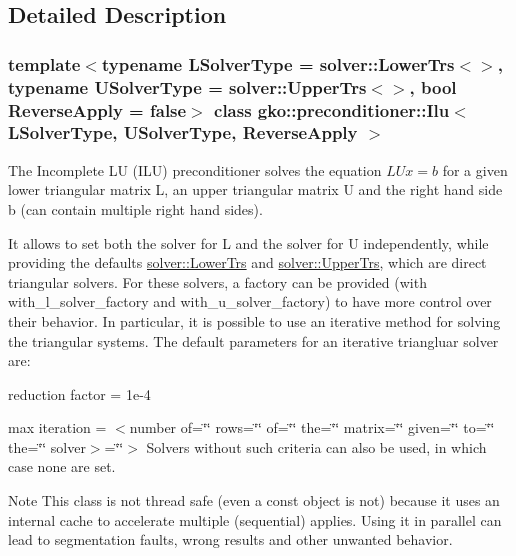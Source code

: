 \subsection{Detailed Description}
\subsubsection*{template$<$typename L\+Solver\+Type = solver\+::\+Lower\+Trs$<$$>$, typename U\+Solver\+Type = solver\+::\+Upper\+Trs$<$$>$, bool Reverse\+Apply = false$>$\newline
class gko\+::preconditioner\+::\+Ilu$<$ L\+Solver\+Type, U\+Solver\+Type, Reverse\+Apply $>$}

The Incomplete LU (I\+LU) preconditioner solves the equation $LUx = b$ for a given lower triangular matrix L, an upper triangular matrix U and the right hand side b (can contain multiple right hand sides). 

It allows to set both the solver for L and the solver for U independently, while providing the defaults \hyperlink{classgko_1_1solver_1_1LowerTrs}{solver\+::\+Lower\+Trs} and \hyperlink{classgko_1_1solver_1_1UpperTrs}{solver\+::\+Upper\+Trs}, which are direct triangular solvers. For these solvers, a factory can be provided (with {\ttfamily with\+\_\+l\+\_\+solver\+\_\+factory} and {\ttfamily with\+\_\+u\+\_\+solver\+\_\+factory}) to have more control over their behavior. In particular, it is possible to use an iterative method for solving the triangular systems. The default parameters for an iterative triangluar solver are\+:
\begin{DoxyItemize}
\item reduction factor = 1e-\/4
\item max iteration = $<$number of=\char`\"{}\char`\"{} rows=\char`\"{}\char`\"{} of=\char`\"{}\char`\"{} the=\char`\"{}\char`\"{} matrix=\char`\"{}\char`\"{} given=\char`\"{}\char`\"{} to=\char`\"{}\char`\"{} the=\char`\"{}\char`\"{} solver$>$=\char`\"{}\char`\"{}$>$ Solvers without such criteria can also be used, in which case none are set.
\end{DoxyItemize}

\begin{DoxyNote}{Note}
This class is not thread safe (even a const object is not) because it uses an internal cache to accelerate multiple (sequential) applies. Using it in parallel can lead to segmentation faults, wrong results and other unwanted behavior.
\end{DoxyNote}


